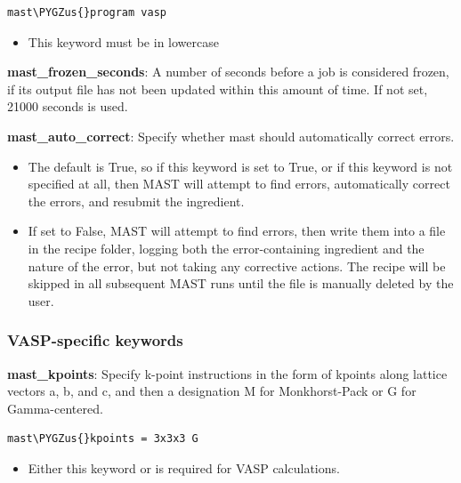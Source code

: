 \documentclass[letterpaper,10pt,english]{sphinxmanual}
\def\PYGZus{\char`\_}
\begin{document}
\begin{Verbatim}[commandchars=\\\{\}]
mast\PYGZus{}program vasp
\end{Verbatim}
\begin{itemize}
\item {} 
This keyword must be in lowercase

\end{itemize}

\textbf{mast\_frozen\_seconds}: A number of seconds before a job is considered frozen, if its output file has not been updated within this amount of time. If not set, 21000 seconds is used.

\textbf{mast\_auto\_correct}: Specify whether mast should automatically correct errors.
\begin{itemize}
\item {} 
The default is True, so if this keyword is set to True, or if this keyword is not specified at all, then MAST will attempt to find errors, automatically correct the errors, and resubmit the ingredient.

\item {} 
If set to False, MAST will attempt to find errors, then write them into a  file in the recipe folder, logging both the error-containing ingredient and the nature of the error, but not taking any corrective actions. The recipe will be skipped in all subsequent MAST runs until the  file is manually deleted by the user.

\end{itemize}


\subsubsection{VASP-specific keywords}
\label{3_1_2_ingredients:vasp-specific-keywords}
\textbf{mast\_kpoints}: Specify k-point instructions in the form of kpoints along lattice vectors a, b, and c, and then a designation M for Monkhorst-Pack or G for Gamma-centered.

\begin{Verbatim}[commandchars=\\\{\}]
mast\PYGZus{}kpoints = 3x3x3 G
\end{Verbatim}
\begin{itemize}
\item {} 
Either this keyword or  is required for VASP calculations.

\end{itemize}
\end{document}
